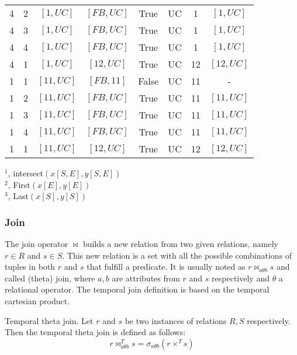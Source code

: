 \begin{table}
\begin{center}
\begin{tabular}{c c c c c c c c}
4 & 2 & $\left[1, UC \right]$   & $\left[FB, UC \right]$ & True  & UC &  1 & $\left[1, UC \right]$ \\
4 & 3 & $\left[1, UC \right]$   & $\left[FB, UC \right]$ & True  & UC &  1 & $\left[1, UC \right]$ \\
4 & 4 & $\left[1, UC \right]$   & $\left[FB, UC \right]$ & True  & UC &  1 & $\left[1, UC \right]$ \\
4 & 1 & $\left[1, UC \right]$   & $\left[12, UC \right]$ & True  & UC & 12 & $\left[12, UC \right]$ \\
1 & 1 & $\left[11, UC \right]$  & $\left[FB, 11 \right]$ & False & UC & 11 & -                      \\
1 & 2 & $\left[11, UC \right]$  & $\left[FB, UC \right]$ & True  & UC & 11 &  $\left[11, UC \right]$ \\
1 & 3 & $\left[11, UC \right]$  & $\left[FB, UC \right]$ & True  & UC & 11 & $\left[11, UC \right]$ \\
1 & 4 & $\left[11, UC \right]$  & $\left[FB, UC \right]$ & True  & UC & 11 & $\left[11, UC \right]$ \\
1 & 1 & $\left[11, UC \right]$  & $\left[12, UC \right]$ & True  & UC & 12 &  $\left[12, UC \right]$ \\
\hline 
\end{tabular}
\label{table:example-crisp-cartesian-product}
\end{center}
$^1$, intersect$\left(x\left[S, E\right], y\left[S, E\right]\right)$\\
$^2$, First$\left(x[E], y[E] \right)$ \\
$^3$, Last$\left(x[S], y[S] \right)$
\end{table}

\subsubsection{\label{sec:join}Join}
The join operator $\Join$ builds a new relation from two given relations, namely $r \in R$ and $s \in S$. This new relation is a set with all the possible combinations of tuples in both $r$ and $s$ that fulfill a predicate. It is usually noted as $r \Join_{a \theta b} s$ and called (theta) join, where $a,b$ are attributes from $r$ and $s$ respectively and $\theta$ a relational operator. The temporal join definition is based on the temporal cartesian product.

\begin{definition}
 \label{def:temporal-theta-join}
Temporal theta join. Let $r$ and $s$ be two  instances of relations $R, S$ respectively. Then the temporal theta join is defined as follows:
\begin{equation}
 \label{eq:temporal-theta-join}
r \Join_{a \theta b}^{T} s= \sigma_{a \theta b} \left(r \times^T s \right)
\end{equation}

\end{definition}


